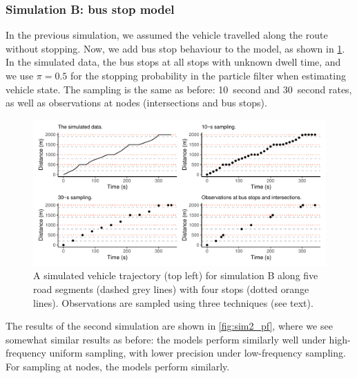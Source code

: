 \subsubsection{Simulation B: bus stop model}
\label{sec:vehicle_sim_B}

In the previous simulation, we assumed the vehicle travelled along the route without stopping. Now, we add bus stop behaviour to the model, as shown in \cref{fig:sim2_graph}. In the simulated data, the bus stops at all stops with unknown dwell time, and we use $\pi=0.5$ for the stopping probability in the particle filter when estimating vehicle state. The sampling is the same as before: 10~second and 30~second rates, as well as observations at nodes (intersections and bus stops).






\begin{knitrout}\small
{}\color{fgcolor}\begin{figure}
\includegraphics[width=\linewidth]{figure/sim2_graph-1} \caption[Vehicle trajectory with sampled observations for simulation B]{A simulated vehicle trajectory (top left) for simulation B along five road segments (dashed grey lines) with four stops (dotted orange lines). Observations are sampled using three techniques (see text).}\label{fig:sim2_graph}
\end{figure}


\end{knitrout}


The results of the second simulation are shown in \cref{fig:sim2_pf}, where we see somewhat similar results as before: the models perform similarly well under high-frequency uniform sampling, with lower precision under low-frequency sampling. For sampling at nodes, the models perform similarly.

